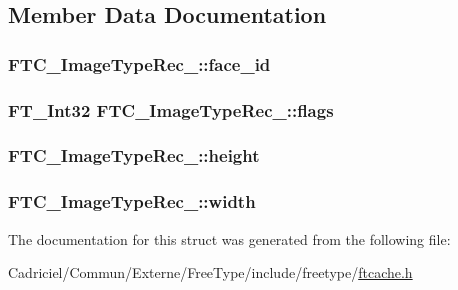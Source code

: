 \subsection{Member Data Documentation}
\hypertarget{struct_f_t_c___image_type_rec___a9851b8d4a06baacd18d5b9856fd85abd}{
\subsubsection[{face\-\_\-id}]{ F\-T\-C\-\_\-\-Image\-Type\-Rec\-\_\-\-::face\-\_\-id}}\label{struct_f_t_c___image_type_rec___a9851b8d4a06baacd18d5b9856fd85abd}
\hypertarget{struct_f_t_c___image_type_rec___a391782ed8c67de86591c71f276ea6454}{
\subsubsection[{flags}]{\setlength{\rightskip}{0pt plus 5cm}F\-T\-\_\-\-Int32 F\-T\-C\-\_\-\-Image\-Type\-Rec\-\_\-\-::flags}}\label{struct_f_t_c___image_type_rec___a391782ed8c67de86591c71f276ea6454}
\hypertarget{struct_f_t_c___image_type_rec___adb56a9d18a3f522d713d0ba01c1a8778}{
\subsubsection[{height}]{ F\-T\-C\-\_\-\-Image\-Type\-Rec\-\_\-\-::height}}\label{struct_f_t_c___image_type_rec___adb56a9d18a3f522d713d0ba01c1a8778}
\hypertarget{struct_f_t_c___image_type_rec___af1a4cccbabb0f5852ed755a12ed08dd8}{
\subsubsection[{width}]{ F\-T\-C\-\_\-\-Image\-Type\-Rec\-\_\-\-::width}}\label{struct_f_t_c___image_type_rec___af1a4cccbabb0f5852ed755a12ed08dd8}


The documentation for this struct was generated from the following file\-:\begin{DoxyCompactItemize}
\item 
Cadriciel/\-Commun/\-Externe/\-Free\-Type/include/freetype/\hyperlink{ftcache_8h}{ftcache.\-h}\end{DoxyCompactItemize}
